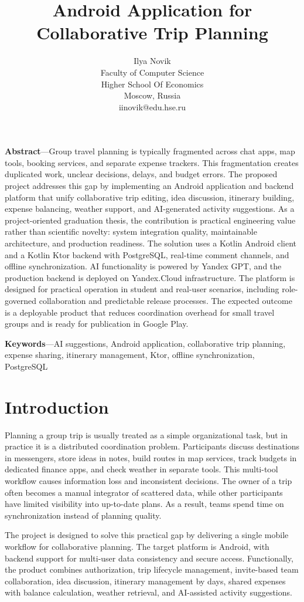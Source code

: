 \documentclass[10pt,twocolumn]{article}
\title{\textbf{Android Application for Collaborative Trip Planning}}
\author{
Ilya Novik\\
Faculty of Computer Science\\Higher School Of Economics\\
Moscow, Russia\\
iinovik@edu.hse.ru
}
\date{}
\begin{document}
\maketitle

\textbf{Abstract}---Group travel planning is typically fragmented across chat apps, map tools, booking services, and separate expense trackers. This fragmentation creates duplicated work, unclear decisions, delays, and budget errors. The proposed project addresses this gap by implementing an Android application and backend platform that unify collaborative trip editing, idea discussion, itinerary building, expense balancing, weather support, and AI-generated activity suggestions. As a project-oriented graduation thesis, the contribution is practical engineering value rather than scientific novelty: system integration quality, maintainable architecture, and production readiness. The solution uses a Kotlin Android client and a Kotlin Ktor backend with PostgreSQL, real-time comment channels, and offline synchronization. AI functionality is powered by Yandex GPT, and the production backend is deployed on Yandex.Cloud infrastructure. The platform is designed for practical operation in student and real-user scenarios, including role-governed collaboration and predictable release processes. The expected outcome is a deployable product that reduces coordination overhead for small travel groups and is ready for publication in Google Play.

\textbf{Keywords}---AI suggestions, Android application, collaborative trip planning, expense sharing, itinerary management, Ktor, offline synchronization, PostgreSQL

\section{Introduction}

Planning a group trip is usually treated as a simple organizational task, but in practice it is a distributed coordination problem. Participants discuss destinations in messengers, store ideas in notes, build routes in map services, track budgets in dedicated finance apps, and check weather in separate tools. This multi-tool workflow causes information loss and inconsistent decisions. The owner of a trip often becomes a manual integrator of scattered data, while other participants have limited visibility into up-to-date plans. As a result, teams spend time on synchronization instead of planning quality.

The project is designed to solve this practical gap by delivering a single mobile workflow for collaborative planning. The target platform is Android, with backend support for multi-user data consistency and secure access. Functionally, the product combines authorization, trip lifecycle management, invite-based team collaboration, idea discussion, itinerary management by days, shared expenses with balance calculation, weather retrieval, and AI-assisted activity suggestions.
\end{document}
